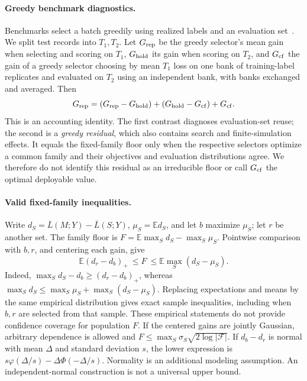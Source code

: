 \documentclass[runningheads]{llncs}
\begin{document}
\paragraph{Greedy benchmark diagnostics.} Benchmarks select a batch greedily using realized labels and an evaluation set~\cite{werner2023comparable,werner2024cdalbench}. We split test records into $T_1,T_2$. Let $G_{\rm rep}$ be the greedy selector's mean gain when selecting and scoring on $T_1$, $G_{\rm hold}$ its gain when scoring on $T_2$, and $G_{\rm cf}$ the gain of a greedy selector choosing by mean $T_1$ loss on one bank of training-label replicates and evaluated on $T_2$ using an independent bank, with banks exchanged and averaged. Then
\[
G_{\rm rep}=(G_{\rm rep}-G_{\rm hold})+(G_{\rm hold}-G_{\rm cf})+G_{\rm cf}.
\]
This is an accounting identity. The first contrast diagnoses evaluation-set reuse; the second is a \emph{greedy residual}, which also contains search and finite-simulation effects. It equals the fixed-family floor only when the respective selectors optimize a common family and their objectives and evaluation distributions agree. We therefore do not identify this residual as an irreducible floor or call $G_{\rm cf}$ the optimal deployable value.

\paragraph{Valid fixed-family inequalities.} Write $d_S=\bar L(M;Y)-\bar L(S;Y)$, $\mu_S=\mathbb E d_S$, and let $b$ maximize $\mu_S$; let $r$ be another set. The family floor is $F=\mathbb E\max_S d_S-\max_S\mu_S$. Pointwise comparison with $b,r$, and centering each gain, give
\begin{equation}
\mathbb E(d_r-d_b)_+\ \leq F\ \leq\mathbb E\max_S(d_S-\mu_S).\label{eq:two}
\end{equation}
Indeed, $\max_S d_S-d_b\ge(d_r-d_b)_+$, whereas $\max_S d_S\le\max_S\mu_S+\max_S(d_S-\mu_S)$. Replacing expectations and means by the same empirical distribution gives exact sample inequalities, including when $b,r$ are selected from that sample. These empirical statements do not provide confidence coverage for population $F$. If the centered gains are jointly Gaussian, arbitrary dependence is allowed and $F\le\max_S\sigma_S\sqrt{2\log|\mathcal F|}$. If $d_b-d_r$ is normal with mean $\Delta$ and standard deviation $s$, the lower expression is $s\varphi(\Delta/s)-\Delta\Phi(-\Delta/s)$. Normality is an additional modeling assumption. An independent-normal construction is not a universal upper bound.
\end{document}
